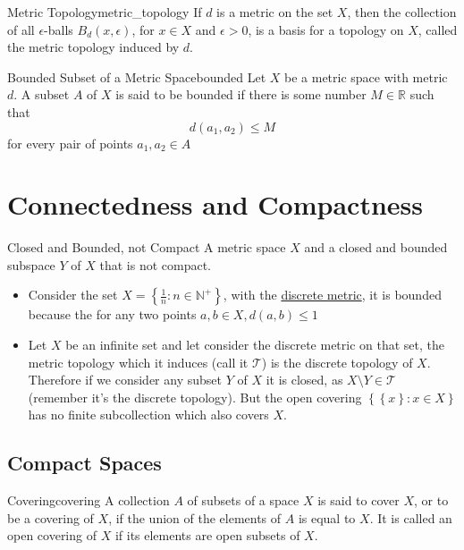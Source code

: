 \begin{definition}{Metric Topology}{metric_topology}
If $d$ is a metric on the set $X$, then the collection of all $\epsilon$-balls $B_{d}(x, \epsilon)$, for $x \in X$ and $\epsilon>0$, is a basis for a topology on $X$, called the metric topology induced by $d$.
\end{definition}


\begin{definition}{Bounded Subset of a Metric Space}{bounded}
Let $X$ be a metric space with metric $d$. A subset $A$ of $X$ is said to be bounded if there is some number $M \in  \mathbb{R}$ such that
\[
d\left(a_{1}, a_{2}\right) \leq M
\]
for every pair of points $ a_{ 1 } , a_{ 2 } \in  A $ 
\end{definition}


\section{Connectedness and Compactness}

\begin{example}{Closed and Bounded, not Compact}{}
A metric space $X$  and a closed and bounded subspace $Y$ of  $X$  that is not compact.
\end{example}

\begin{itemize}
    \item Consider the set $ X =  \left\{ \frac{1}{n}: n \in  \mathbb{N} ^{ +  }  \right\}  $, with the \hyperref[example:discrete_metric]{discrete metric}, it is bounded because the for any two points $ a, b \in X, d\left( a, b \right)  \le 1 $  
    \item Let $ X $ be an infinite set and let consider the discrete metric on that set,  the metric topology which it induces (call it $ \mathcal{ T }  $)  is the discrete topology of $ X $. Therefore if we consider any subset $ Y $ of $ X $ it is closed, as $ X \setminus Y \in  \mathcal{ T }  $ (remember it's the discrete topology). But the open covering $ \left\{ \left\{ x \right\} : x \in  X \right\}  $ has no finite subcollection which also covers $ X $.
\end{itemize}


\subsection{Compact Spaces}

\begin{definition}{Covering}{covering}
A collection $A$ of subsets of a space $X$ is said to cover $X$, or to be a covering of $X$, if the union of the elements of $A$ is equal to $X$. It is called an open covering of $X$ if its elements are open subsets of $X$.
\end{definition}

